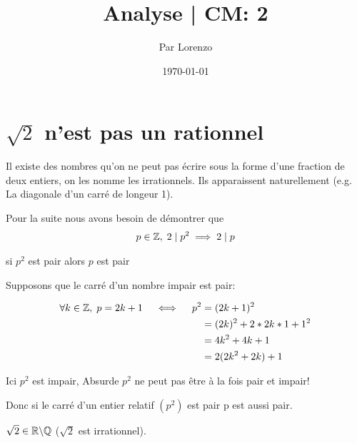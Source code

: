 \documentclass[a4paper, 12pt]{article}
\title{Analyse | CM: 2}
\author{Par Lorenzo}
\date{\today}
\begin{document}
\maketitle

\section{$\sqrt{2}$ n'est pas un rationnel}

Il existe des nombres qu'on ne peut pas écrire sous la forme d'une fraction de deux entiers, on les nomme les irrationnels.
Ils apparaissent naturellement (e.g. La diagonale d'un carré de longeur 1).

\begin{proposition} \label{propal}
    Pour la suite nous avons besoin de démontrer que 
    \begin{align*}
        p \in \mathbb{Z}, \; 2 \mid p^2 \implies 2 \mid p
    \end{align*}

    si $p^2$ est pair alors $p$ est pair

\end{proposition}

\begin{demonstration}
    Supposons que le carré d'un nombre impair est pair:

    \begin{align*}
        \forall k \in \mathbb{Z}, \; p = 2k + 1 \quad \iff \quad p^2 =&\; (2k + 1)^2 \\
         =&\; (2k)^2 + 2*2k*1 + 1^2 \\
         =&\; 4k^2 + 4k + 1 \\
         =&\; 2(2k^2 + 2k) + 1
    \end{align*}

    
    Ici $p^2$ est impair, Absurde $p^2$ ne peut pas être à la fois pair et impair!
    \begin{rdem}
        Donc si le carré d'un entier relatif $(p^2)$ est pair p est aussi pair.
    \end{rdem}

\end{demonstration}

\begin{proposition}
    $\sqrt{2} \in \mathbb{R} \backslash \mathbb{Q}$ ($\sqrt{2}$ est irrationnel).
\end{proposition}
\end{document}
